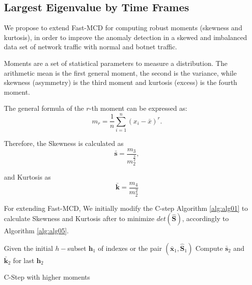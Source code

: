\documentclass[review]{elsarticle}
\begin{document}
\subsection{Largest Eigenvalue by Time Frames}
\label{sec:prop_LargestEigenvaluebyTimeFrames}

We propose to extend Fast-MCD for computing robust moments (skewness and kurtosis), in order to improve the anomaly detection in a skewed and imbalanced data set of network traffic with normal and botnet traffic.
	    
Moments are a set of statistical parameters to measure a distribution. The arithmetic mean is the first general moment, the second is the variance, while skewness (asymmetry) is the third moment and kurtosis (excess) is the fourth moment.

The general formula of the $r$-th moment can be expressed as:
\begin{equation}\label{eq:eq05}
	m_r = \displaystyle\frac{1}{n}\displaystyle\sum_{i = 1}^{n}( x_i - \bar{x})^r. 
\end{equation}

Therefore, the Skewness is calculated as
\begin{equation}\label{eq:eq06}
	\boldsymbol{\bar{s}} = \frac{m_3}{m_2^{\frac{3}{2}}},
\end{equation}

and Kurtosis as
\begin{equation}\label{eq:eq07}
	\boldsymbol{\bar{k}} = \frac{m_4}{m_2^2} 
\end{equation}

For extending Fast-MCD, We initially modify the C-step Algorithm \ref{alg:alg01} to calculate Skewness and Kurtosis after to minimize $det(\boldsymbol{\hat{S}})$, accordingly to Algorithm \ref{alg:alg05}.

\begin{algorithm}[H]\label{alg:alg05}
	\scriptsize
	\SetAlgoLined
	Given the initial $h-$subset $\boldsymbol{h}_1$ of indexes or the pair $(\boldsymbol{\bar{x}}_1, \boldsymbol{\hat{S}}_1)$\;
	Compute $\boldsymbol{\bar{s}}_2$ and $\boldsymbol{\bar{k}}_2$ for last $\boldsymbol{h}_2$\;
	\caption{C-Step with higher moments}
\end{algorithm}
\end{document}
